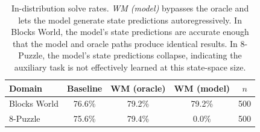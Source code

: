 \begin{table}[t]
\centering
\caption{In-distribution solve rates. \textit{WM (model)} bypasses the oracle and lets the model generate state predictions autoregressively. In Blocks World, the model's state predictions are accurate enough that the model and oracle paths produce identical results. In 8-Puzzle, the model's state predictions collapse, indicating the auxiliary task is not effectively learned at this state-space size.}
\label{tab:wm-aux}
\begin{tabular}{lcccc}
\toprule
Domain & Baseline & WM (oracle) & WM (model) & $n$ \\
\midrule
Blocks World & 76.6\% & 79.2\% & 79.2\% & 500 \\
8-Puzzle & 75.6\% & 79.4\% & 0.0\% & 500 \\
\bottomrule
\end{tabular}
\end{table}
